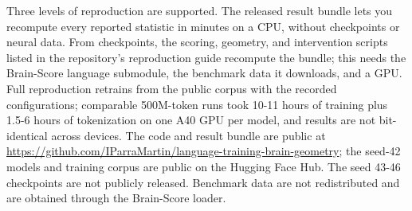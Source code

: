 \documentclass[mlmain]{jmlr}
\begin{document}
Three levels of reproduction are supported. The released result bundle lets you recompute every reported statistic in minutes on a CPU, without checkpoints or neural data. From checkpoints, the scoring, geometry, and intervention scripts listed in the repository's reproduction guide recompute the bundle; this needs the Brain-Score language submodule, the benchmark data it downloads, and a GPU. Full reproduction retrains from the public corpus with the recorded configurations; comparable 500M-token runs took 10-11 hours of training plus 1.5-6 hours of tokenization on one A40 GPU per model, and results are not bit-identical across devices. The code and result bundle are public at \url{https://github.com/IParraMartin/language-training-brain-geometry}; the seed-42 models and training corpus are public on the Hugging Face Hub. The seed 43-46 checkpoints are not publicly released. Benchmark data are not redistributed and are obtained through the Brain-Score loader.
\end{document}
